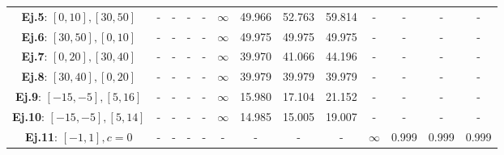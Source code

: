 \begin{table}
\begin{tabular}{|c|cccc|cccc|cccc|}
		\textbf{Ej.5}: $[0,10], [30,50]$           & -                                             & -                                                & -                                   & -        & $\infty$       & 49.966         & 52.763                  & 59.814   & -              & -              & -                       & -        \\
		\textbf{Ej.6}: $[30,50], [0,10]$           & -                                             & -                                                & -                                   & -        & $\infty$       & 49.975         & 49.975                  & 49.975   & -              & -              & -                       & -        \\
		\textbf{Ej.7}: $[0,20], [30,40]$           & -                                             & -                                                & -                                   & -        & $\infty$       & 39.970         & 41.066                  & 44.196   & -              & -              & -                       & -        \\
		\textbf{Ej.8}: $[30,40], [0,20]$           & -                                             & -                                                & -                                   & -        & $\infty$       & 39.979         & 39.979                  & 39.979   & -              & -              & -                       & -        \\
		\textbf{Ej.9}: $[-15,-5], [5,16]$          & -                                             & -                                                & -                                   & -        & $\infty$       & 15.980         & 17.104                  & 21.152   & -              & -              & -                       & -        \\
		\textbf{Ej.10}: $[-15,-5], [5,14]$         & -                                             & -                                                & -                                   & -        & $\infty$       & 14.985         & 15.005                  & 19.007   & -              & -              & -                       & -        \\
		\textbf{Ej.11}: $[-1,1], c=0$              & -                                             & -                                                & -                                   & -        & -              & -              & -                       & -        & $\infty$       & 0.999          & 0.999                   & 0.999    \\

\end{tabular}
\end{table}
